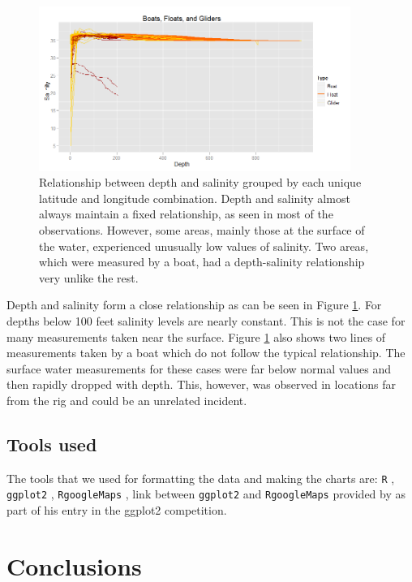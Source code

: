 \documentclass[authoryear,12pt]{elsarticle}
\begin{document}
\begin{figure}[htbp] %
   \centering
   \includegraphics[width=4in]{deapth-salinity.png} 
   \caption{Relationship between depth and salinity grouped by each unique latitude and longitude combination. Depth and salinity almost always maintain a fixed relationship, as seen in most of the observations. However, some areas, mainly those at the surface of the water, experienced unusually low values of salinity. Two areas, which were measured by a boat, had a depth-salinity relationship very unlike the rest.}
   \label{Depth-Salinity}
\end{figure}
Depth and salinity form a close relationship as can be seen in Figure \ref{Depth-Salinity}. For depths below 100 feet salinity levels are nearly constant. This is not the case for many measurements taken near the surface. Figure \ref{Depth-Salinity}  also shows  two lines of measurements taken by a boat which do not follow the {typical} relationship. The surface water measurement{s for these cases were} far below normal {values} and {then rapidly} dropped  with depth. This, however, was {observed} in locations far from the rig and {could be an} unrelated incident.

\subsection{Tools used}
The tools that we used for formatting the data and making the charts are:
{\tt R} \citep{R2011}, {\tt ggplot2} \citep{ggplot2}, {\tt RgoogleMaps} \citep{RgoogleMaps}, link between {\tt ggplot2} and {\tt RgoogleMaps} provided by \citet{kahle2010} as part of his entry in the ggplot2 competition.



\section{Conclusions}
\end{document}
